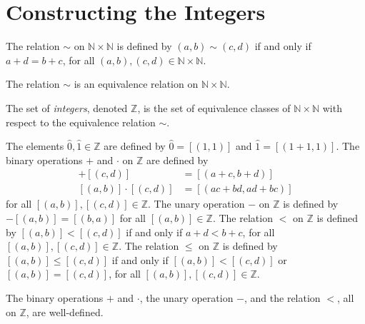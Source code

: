 
\section{Constructing the Integers}
\label{int}

\begin{definition} %
	The relation $\sim$ on $\mathbb{N} \times \mathbb{N}$ is defined by $(a, b) \sim (c, d)$ if and only if $a + d = b + c$, for all $(a, b), (c, d) \in \mathbb{N} \times \mathbb{N}$.
\end{definition}

\begin{lemma} %
	\label{int:l:equiv}
	The relation $\sim$ is an equivalence relation on $\mathbb{N} \times \mathbb{N}$.
\end{lemma}

\begin{definition} %
	\label{int:d:z_ops}
	The set of \emph{integers}, denoted $\mathbb{Z}$, is the set of equivalence classes of $\mathbb{N} \times \mathbb{N}$ with respect to the equivalence relation $\sim$.

	The elements $\hat{0}, \hat{1} \in \mathbb{Z}$ are defined by $\hat{0} = [(1, 1)]$ and $\hat{1} = [(1 + 1, 1)]$. The binary operations $+$ and $\cdot$ on $\mathbb{Z}$ are defined by
	\begin{align*}
		[(a, b)] + [(c, d)]     & = [(a + c, b + d)]         \\
		[(a, b)] \cdot [(c, d)] & = [(a c + b d, a d + b c)]
	\end{align*}
	for all $[(a, b)], [(c, d)] \in \mathbb{Z}$. The unary operation $-$ on $\mathbb{Z}$ is defined by $-[(a, b)] = [(b, a)]$ for all $[(a, b)] \in \mathbb{Z}$. The relation $<$ on $\mathbb{Z}$ is defined by $[(a, b)] < [(c, d)]$ if and only if $a + d < b + c$, for all $[(a, b)], [(c, d)] \in \mathbb{Z}$. The relation $\leq$ on $\mathbb{Z}$ is defined by $[(a, b)] \leq [(c, d)]$ if and only if $[(a, b)] < [(c, d)]$ or $[(a, b)] = [(c, d)]$, for all $[(a, b)], [(c, d)] \in \mathbb{Z}$.
\end{definition}

\begin{lemma} %
	\label{int:l:well_defined}
	The binary operations $+$ and $\cdot$, the unary operation $-$, and the relation $<$, all on $\mathbb{Z}$, are well-defined.
\end{lemma}

